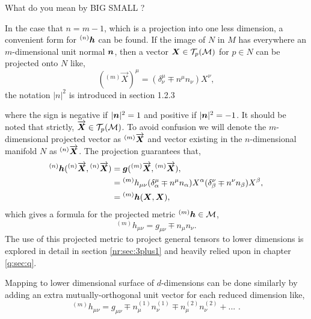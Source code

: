 \color{choral} What do you mean by BIG SMALL ? \color{black}

In the case that $n=m-1$, which is a projection into one less dimension, a convenient form for ${}^{(n)}\boldsymbol{h}$ can be found. If the image of $N$ in $M$ has everywhere an $m$-dimensional unit normal $\boldsymbol{n}$, then a vector $\boldsymbol{X}\in \mathcal{T}_p(\mathcal{M})$ for $p\in N$ can be projected onto $N$ like,
\begin{equation}
({}^{(m)}\overrightarrow{{X}})^\mu = (\delta^\mu_\nu \mp n^\mu n_\nu )X^\nu,
\end{equation}
\color{choral} the notation $|n|^2$ is introduced in section 1.2.3 \color{black}

where the sign is negative if $|\boldsymbol{n}|^2=1$ and positive if $|\boldsymbol{n}|^2 = -1$. It should be noted that strictly, $\overrightarrow{\boldsymbol{X}} \in \mathcal{T}_p(\mathcal{M})$. To avoid confusion we will denote the $m$-dimensional projected vector as ${}^{(m)}\overrightarrow{\boldsymbol{X}}$ and vector existing in the $n$-dimensional manifold $N$ as ${}^{(n)}\overrightarrow{\boldsymbol{X}}$. The projection guarantees that,
\begin{align}
{}^{(n)}\boldsymbol{h} ({}^{(n)}\overrightarrow{\boldsymbol{X}},{}^{(n)}\overrightarrow{\boldsymbol{X}}  ) &= \boldsymbol{g} ({}^{(m)}\overrightarrow{\boldsymbol{X}},{}^{(m)}\overrightarrow{\boldsymbol{X}}  ),\\
&= {}^{(m)}{h}_{\mu\nu} (\delta^\mu_\alpha \mp n^\mu n_\alpha) {{X}}^\alpha(\delta^\nu_\beta \mp n^\nu n_\beta) {{X}}^\beta  ,\\
&= {}^{(m)}\boldsymbol{h} ({\boldsymbol{X}},{\boldsymbol{X}}  ),
\end{align}
which gives a formula for the projected metric ${}^{(m)}\boldsymbol{h} \in \mathcal{M}$,
\begin{equation}
{}^{(m)}h_{\mu\nu} = g_{\mu\nu} \mp n_\mu n_\nu.
\end{equation}
The use of this projected metric to project general tensors to lower dimensions is explored in detail in section \ref{nr:sec:3plus1} and heavily relied upon in chapter \ref{q:sec:q}.

Mapping to lower dimensional surface of $d$-dimensions can be done similarly by
adding an extra mutually-orthogonal unit vector for each reduced dimension like,
\begin{equation}
{}^{(m)}h_{\mu\nu} = g_{\mu\nu} \mp n^{(1)}_\mu n^{(1)}_\nu  \mp n^{(2)}_\mu n^{(2)}_\nu + ... \,\,.
\end{equation}

